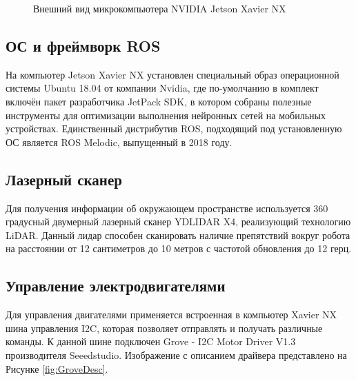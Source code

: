 \documentclass[12pt,a4paper]{scrartcl}
\begin{document}
					\begin{figure}[h]
						\caption{Внешний вид микрокомпьютера NVIDIA Jetson Xavier NX\cite{bib:XavierNXPhoto}}
						\label{fig:XavierNXPhoto}
					\end{figure}	
					
			\subsection{ОС и фреймворк ROS}
				На компьютер Jetson Xavier NX установлен специальный образ операционной системы Ubuntu 18.04 от компании Nvidia, где по-умолчанию в комплект включён пакет разработчика JetPack SDK, в котором собраны полезные инструменты для оптимизации выполнения нейронных сетей на мобильных устройствах. Единственный дистрибутив ROS, подходящий под установленную ОС является ROS Melodic, выпущенный в 2018 году.
			\subsection{Лазерный сканер}
				Для получения информации об окружающем пространстве используется 360 градусный двумерный лазерный сканер YDLIDAR X4, реализующий технологию LiDAR. Данный лидар способен сканировать наличие препятствий вокруг робота на расстоянии от 12 сантиметров до 10 метров с частотой обновления до 12 герц\cite{bib:YDLidarX4Desc}.
			\subsection{Управление электродвигателями}
				Для управления двигателями применяется встроенная в компьютер Xavier NX шина управления I2C, которая позволяет отправлять и получать различные команды. К данной шине подключен Grove - I2C Motor Driver V1.3 производителя Seeedstudio. Изображение с описанием драйвера представлено на Рисунке \ref{fig:GroveDesc}.
				
\end{document}
